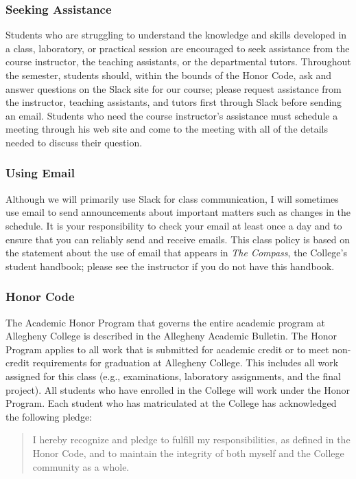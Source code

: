 \subsubsection*{Seeking Assistance}

Students who are struggling to understand the knowledge and skills developed in a class, laboratory, or practical
session are encouraged to seek assistance from the course instructor, the teaching assistants, or the departmental
tutors. Throughout the semester, students should, within the bounds of the Honor Code, ask and answer questions on the
Slack site for our course; please request assistance from the instructor, teaching assistants, and tutors first through
Slack before sending an email. Students who need the course instructor's assistance must schedule a meeting through his
web site and come to the meeting with all of the details needed to discuss their question.

\subsubsection*{Using Email}

Although we will primarily use Slack for class communication, I will sometimes use email to send announcements about
important matters such as changes in the schedule. It is your responsibility to check your email at least once a day and
to ensure that you can reliably send and receive emails. This class policy is based on the statement about the use of
email that appears in {\em The Compass}, the College's student handbook; please see the instructor if you do not have
this handbook.

\subsubsection*{Honor Code}

The Academic Honor Program that governs the entire academic program at Allegheny College is described in the Allegheny
Academic Bulletin.  The Honor Program applies to all work that is submitted for academic credit or to meet non-credit
requirements for graduation at Allegheny College.  This includes all work assigned for this class (e.g., examinations,
laboratory assignments, and the final project).  All students who have enrolled in the College will work under the Honor
Program.  Each student who has matriculated at the College has acknowledged the following pledge:

\vspace*{-.11in}
\begin{quote}
  I hereby recognize and pledge to fulfill my responsibilities, as defined in the Honor Code, and to maintain the
  integrity of both myself and the College community as a whole.
\end{quote}
\vspace*{-.11in}

